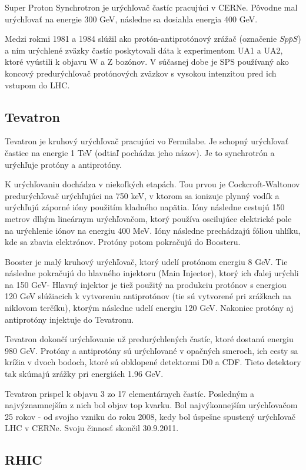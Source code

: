 \documentclass[../../main.tex]{subfiles}
\begin{document}
Super Proton Synchrotron je urýchľovač častíc pracujúci v CERNe. Pôvodne mal urýchľovať na energie 300 GeV, následne sa dosiahla energia 400 GeV.

Medzi rokmi 1981 a 1984 slúžil ako protón-antiprotónový zrážač (označenie $Sp\bar{p}S$) a ním urýchlené zväzky častíc poskytovali dáta k experimentom UA1 a UA2, ktoré vyústili k objavu W a Z bozónov. V súčasnej dobe je SPS používaný ako koncový predurýchľovač protónových zväzkov s vysokou intenzitou pred ich vstupom do LHC.

\subsection{Tevatron}

Tevatron je kruhový urýchľovač pracujúci vo Fermilabe. Je schopný urýchľovať častice na energie 1 TeV (odtiaľ pochádza jeho názov). Je to synchrotrón a urýchľuje protóny a antiprotóny.

K urýchľovaniu dochádza v niekoľkých etapách. Tou prvou je Cockcroft-Waltonov predurýchľovač urýchľujúci na 750 keV, v ktorom sa ionizuje plynný vodík a urýchľujú záporné ióny použitím kladného napätia. Ióny následne cestujú 150 metrov dlhým lineárnym urýchľovačom, ktorý používa oscilujúce elektrické pole na urýchlenie iónov na energiu 400 MeV. Ióny následne prechádzajú fóliou uhlíku, kde sa zbavia elektrónov. Protóny potom pokračujú do Boosteru.

Booster je malý kruhový urýchľovač, ktorý udelí protónom energiu 8 GeV. Tie následne pokračujú do hlavného injektoru (Main Injector), ktorý ich ďalej urýchli na 150 GeV- Hlavný injektor je tiež použitý na produkciu protónov s energiou 120 GeV slúžiacich k vytvoreniu antiprotónov (tie sú vytvorené pri zrážkach na niklovom terčíku), ktorým následne udelí energiu 120 GeV. Nakoniec protóny aj antiprotóny injektuje do Tevatronu.

Tevatron dokončí urýchľovanie už predurýchlených častíc, ktoré dostanú energiu 980 GeV. Protóny a antiprotóny sú urýchľované v opačných smeroch, ich cesty sa krížia v dvoch bodoch, ktoré sú obklopené detektormi D0 a CDF. Tieto detektory tak skúmajú zrážky pri energiách 1.96 GeV.

Tevatron prispel k objavu 3 zo 17 elementárnych častíc. Posledným a najvýznamnejším z nich bol objav top kvarku. Bol najvýkonnejším urýchľovačom 25 rokov - od svojho vzniku do roku 2008, kedy bol úspešne spustený urýchľovač LHC v CERNe. Svoju činnosť skončil 30.9.2011.

\subsection{RHIC}
\end{document}

